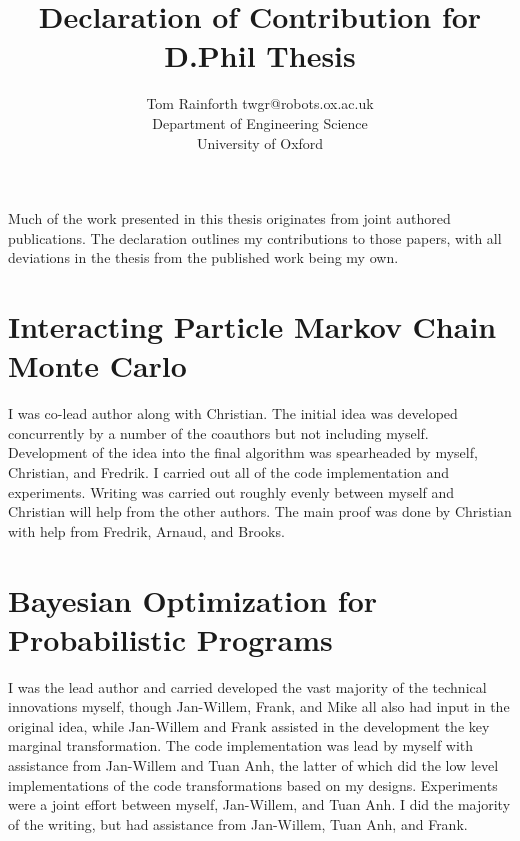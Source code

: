 \documentclass[a4paper,twoside,12pt]{article}
\begin{document}
 

\title{\vspace{-40pt} Declaration of Contribution for D.Phil Thesis}

\author{\name Tom Rainforth \email twgr@robots.ox.ac.uk\\
	        \addr 
	        Department of Engineering Science \\
	         University of Oxford}

\maketitle


\vspace{-30pt}

Much of the work presented in this thesis originates from joint authored publications.  The declaration
outlines my contributions to those papers, with all deviations in the thesis from the published work being my own.

 
\section{Interacting Particle Markov Chain Monte Carlo}

\textit{}

I was co-lead author along with Christian.  The initial idea was developed concurrently by a number of the
coauthors but not including myself.  Development of the idea into the final algorithm was spearheaded by
myself, Christian, and Fredrik.  I carried out all of the code implementation and experiments.  Writing was carried
out roughly evenly between myself and Christian will help from the other authors.  The main proof was done by
Christian with help from Fredrik, Arnaud, and Brooks.

\section{Bayesian Optimization for Probabilistic Programs}

\textit{}

\textit{}

I was the lead author and carried developed the vast majority of the technical innovations myself, though Jan-Willem, Frank,
and Mike all also had input in the original idea, while Jan-Willem and Frank assisted in the
development the key marginal transformation.  The code implementation was lead by myself with assistance from
Jan-Willem and Tuan Anh, the latter of which did the low level implementations of the code transformations based on my
designs.  Experiments were a joint effort between myself, Jan-Willem, and Tuan Anh.  I did the majority of the writing,
but had assistance from Jan-Willem, Tuan Anh, and Frank.  
\end{document}
